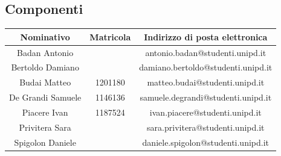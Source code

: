 \subsection{Componenti}
\begin{table}[H]
	\centering
	\renewcommand{\arraystretch}{1.5}
	\begin{tabular}{|c|c|c|}
		\hline
		\rowcolor{lighter-grayer}
		Nominativo & Matricola & Indirizzo di posta elettronica \\
		\hline
		Badan Antonio &  & antonio.badan@studenti.unipd.it\\
		\hline
		Bertoldo Damiano &  & damiano.bertoldo@studenti.unipd.it \\
		\hline
		Budai Matteo & 1201180 &  matteo.budai@studenti.unipd.it \\
		\hline
		De Grandi Samuele & 1146136 & samuele.degrandi@studenti.unipd.it \\
		\hline
		Piacere Ivan & 1187524 & ivan.piacere@studenti.unipd.it \\
		\hline
		Privitera Sara &  & sara.privitera@studenti.unipd.it \\
		\hline
		Spigolon Daniele &  & daniele.spigolon@studenti.unipd.it \\
		\hline
	\end{tabular}
\end{table}